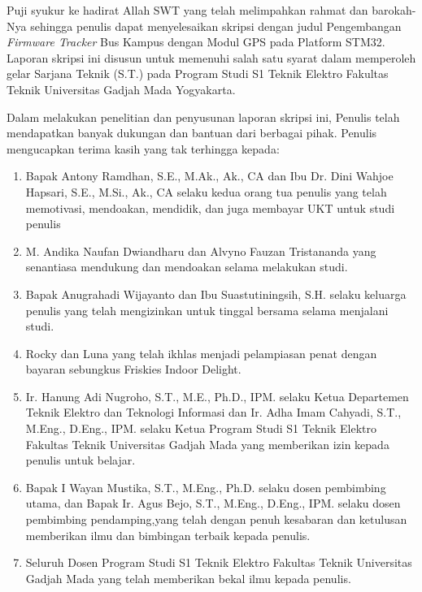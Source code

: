 Puji syukur ke hadirat Allah SWT yang telah melimpahkan rahmat dan barokah-Nya sehingga penulis dapat menyelesaikan skripsi dengan judul Pengembangan \textit{Firmware Tracker} Bus Kampus dengan Modul GPS pada Platform STM32. Laporan skripsi ini disusun untuk memenuhi salah satu syarat dalam memperoleh gelar Sarjana Teknik (S.T.) pada Program Studi S1 Teknik Elektro Fakultas Teknik Universitas Gadjah Mada Yogyakarta.


Dalam melakukan penelitian dan penyusunan laporan skripsi ini, Penulis telah mendapatkan banyak dukungan dan bantuan dari berbagai pihak. Penulis mengucapkan terima kasih yang tak terhingga kepada:

\begin{enumerate}
	\item Bapak Antony Ramdhan, S.E., M.Ak., Ak., CA dan Ibu Dr. Dini Wahjoe Hapsari, S.E., M.Si., Ak., CA selaku kedua orang tua penulis yang telah memotivasi, mendoakan, mendidik, dan juga membayar UKT untuk studi penulis
	
	\item M. Andika Naufan Dwiandharu dan Alvyno Fauzan Tristananda yang senantiasa mendukung dan mendoakan selama melakukan studi.
	
	\item Bapak Anugrahadi Wijayanto dan Ibu Suastutiningsih, S.H. selaku keluarga penulis  yang telah mengizinkan untuk tinggal bersama selama menjalani studi.
	
	\item Rocky dan Luna yang telah ikhlas menjadi pelampiasan penat dengan bayaran sebungkus Friskies Indoor Delight.
	
	\item Ir. Hanung Adi Nugroho, S.T., M.E., Ph.D., IPM. selaku Ketua Departemen Teknik Elektro dan Teknologi Informasi dan Ir. Adha Imam Cahyadi, S.T., M.Eng., D.Eng., IPM. selaku Ketua Program Studi S1 Teknik Elektro Fakultas Teknik Universitas Gadjah Mada yang memberikan izin kepada penulis untuk belajar.
		
	\item Bapak I Wayan Mustika, S.T., M.Eng., Ph.D. selaku dosen pembimbing utama, dan Bapak Ir. Agus Bejo, S.T., M.Eng., D.Eng., IPM. selaku dosen pembimbing pendamping,yang telah dengan penuh kesabaran dan ketulusan memberikan ilmu dan bimbingan terbaik kepada penulis.
	
	\item Seluruh Dosen Program Studi S1 Teknik Elektro Fakultas Teknik Universitas Gadjah Mada yang telah memberikan bekal ilmu kepada penulis.
	

\end{enumerate}
